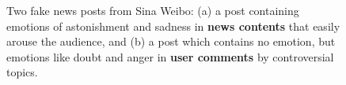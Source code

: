 \documentclass[conference]{IEEEtran}
\newcommand{\kai}[1]{\textcolor{blue}{Kai: {#1}}}
\begin{document}
	\begin{figure}
		\centering
		\begin{minipage}[t]{0.225\textwidth}
		\end{minipage}
		\begin{minipage}[t]{0.225\textwidth}
		\end{minipage}
		\caption{Two fake news posts from Sina Weibo: (a) a post containing emotions of astonishment and sadness in \textbf{news contents} that easily arouse the audience, and (b) a post which contains no emotion, but  emotions like doubt and anger in \textbf{user comments} by controversial topics.}
		\label{Fig:introcase}
	\end{figure}
	
	
\end{document}
